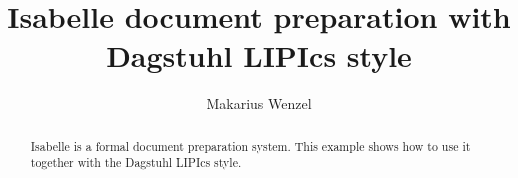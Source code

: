 \documentclass[a4paper,UKenglish,cleveref,autoref]{lipics-v2021}
\title{Isabelle document preparation with Dagstuhl LIPIcs style}
\author{Makarius Wenzel}{Augsburg, Germany \and \url{https://sketis.net}}{}{https://orcid.org/0000-0002-3753-8280}{}
\begin{document}
\maketitle

\begin{abstract}
Isabelle is a formal document preparation system. This example shows how to
use it together with the Dagstuhl LIPIcs style.
\end{abstract}




\end{document}
